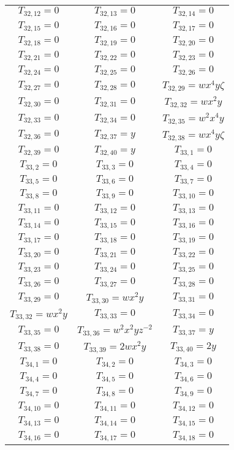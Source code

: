 \begin{longtable}{|c|c|c|}
$T_{32,12}= 0$&
$T_{32,13}= 0$&
$T_{32,14}= 0$\\
$T_{32,15}= 0$&
$T_{32,16}= 0$&
$T_{32,17}= 0$\\
$T_{32,18}= 0$&
$T_{32,19}= 0$&
$T_{32,20}= 0$\\
$T_{32,21}= 0$&
$T_{32,22}= 0$&
$T_{32,23}= 0$\\
$T_{32,24}= 0$&
$T_{32,25}= 0$&
$T_{32,26}= 0$\\
$T_{32,27}= 0$&
$T_{32,28}= 0$&
$T_{32,29}= wx^4y\zeta$\\
$T_{32,30}= 0$&
$T_{32,31}= 0$&
$T_{32,32}= wx^2y$\\
$T_{32,33}= 0$&
$T_{32,34}= 0$&
$T_{32,35}= w^2x^4y$\\
$T_{32,36}= 0$&
$T_{32,37}= y$&
$T_{32,38}= wx^4y\zeta$\\
$T_{32,39}= 0$&
$T_{32,40}= y$&
$T_{33,1}= 0$\\
$T_{33,2}= 0$&
$T_{33,3}= 0$&
$T_{33,4}= 0$\\
$T_{33,5}= 0$&
$T_{33,6}= 0$&
$T_{33,7}= 0$\\
$T_{33,8}= 0$&
$T_{33,9}= 0$&
$T_{33,10}= 0$\\
$T_{33,11}= 0$&
$T_{33,12}= 0$&
$T_{33,13}= 0$\\
$T_{33,14}= 0$&
$T_{33,15}= 0$&
$T_{33,16}= 0$\\
$T_{33,17}= 0$&
$T_{33,18}= 0$&
$T_{33,19}= 0$\\
$T_{33,20}= 0$&
$T_{33,21}= 0$&
$T_{33,22}= 0$\\
$T_{33,23}= 0$&
$T_{33,24}= 0$&
$T_{33,25}= 0$\\
$T_{33,26}= 0$&
$T_{33,27}= 0$&
$T_{33,28}= 0$\\
$T_{33,29}= 0$&
$T_{33,30}= wx^2y$&
$T_{33,31}= 0$\\
$T_{33,32}= wx^2y$&
$T_{33,33}= 0$&
$T_{33,34}= 0$\\
$T_{33,35}= 0$&
$T_{33,36}= w^2x^2yz^{-2}$&
$T_{33,37}= y$\\
$T_{33,38}= 0$&
$T_{33,39}= 2wx^2y$&
$T_{33,40}= 2y$\\
$T_{34,1}= 0$&
$T_{34,2}= 0$&
$T_{34,3}= 0$\\
$T_{34,4}= 0$&
$T_{34,5}= 0$&
$T_{34,6}= 0$\\
$T_{34,7}= 0$&
$T_{34,8}= 0$&
$T_{34,9}= 0$\\
$T_{34,10}= 0$&
$T_{34,11}= 0$&
$T_{34,12}= 0$\\
$T_{34,13}= 0$&
$T_{34,14}= 0$&
$T_{34,15}= 0$\\
$T_{34,16}= 0$&
$T_{34,17}= 0$&
$T_{34,18}= 0$\\

\end{longtable}
